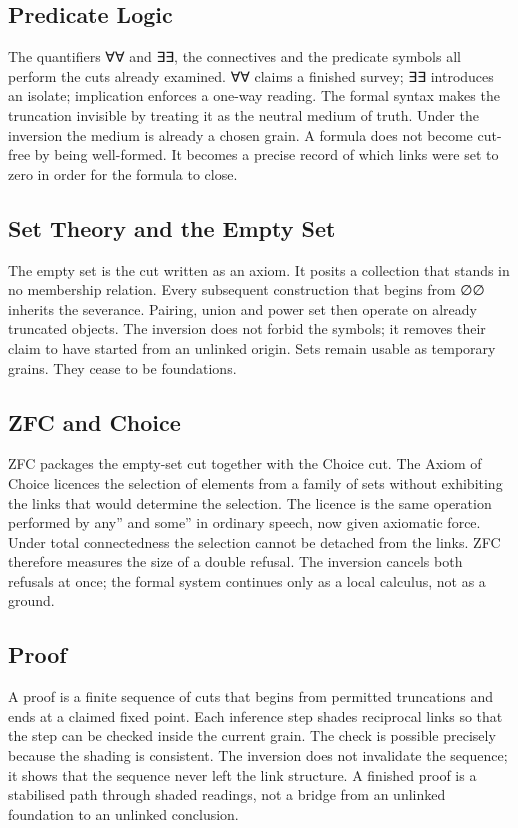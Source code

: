 \documentclass[11pt,a4paper]{article}
\begin{document}
\subsection{Predicate Logic} The quantifiers ∀∀ and ∃∃, the connectives and the predicate symbols all perform the cuts already examined. ∀∀ claims a finished survey; ∃∃ introduces an isolate; implication enforces a one-way reading. The formal syntax makes the truncation invisible by treating it as the neutral medium of truth. Under the inversion the medium is already a chosen grain. A formula does not become cut-free by being well-formed. It becomes a precise record of which links were set to zero in order for the formula to close.

\subsection{Set Theory and the Empty Set} The empty set is the cut written as an axiom. It posits a collection that stands in no membership relation. Every subsequent construction that begins from ∅∅ inherits the severance. Pairing, union and power set then operate on already truncated objects. The inversion does not forbid the symbols; it removes their claim to have started from an unlinked origin. Sets remain usable as temporary grains. They cease to be foundations.

\subsection{ZFC and Choice} ZFC packages the empty-set cut together with the Choice cut. The Axiom of Choice licences the selection of elements from a family of sets without exhibiting the links that would determine the selection. The licence is the same operation performed by any'' and some'' in ordinary speech, now given axiomatic force. Under total connectedness the selection cannot be detached from the links. ZFC therefore measures the size of a double refusal. The inversion cancels both refusals at once; the formal system continues only as a local calculus, not as a ground.

\subsection{Proof} A proof is a finite sequence of cuts that begins from permitted truncations and ends at a claimed fixed point. Each inference step shades reciprocal links so that the step can be checked inside the current grain. The check is possible precisely because the shading is consistent. The inversion does not invalidate the sequence; it shows that the sequence never left the link structure. A finished proof is a stabilised path through shaded readings, not a bridge from an unlinked foundation to an unlinked conclusion.
\end{document}
